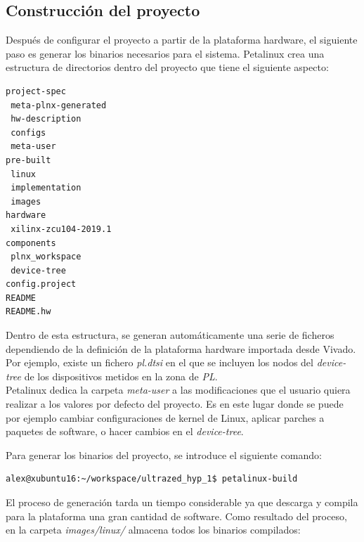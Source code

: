 \subsection{Construcción del proyecto}

Después de configurar el proyecto a partir de la plataforma hardware, el siguiente paso es generar los binarios necesarios para el sistema. Petalinux crea una estructura de directorios dentro del proyecto que tiene el siguiente aspecto:\\

\begin{lstlisting}[style=CStyle]
project-spec
 meta-plnx-generated
 hw-description
 configs
 meta-user
pre-built
 linux
 implementation
 images
hardware
 xilinx-zcu104-2019.1
components
 plnx_workspace
 device-tree
config.project
README
README.hw
\end{lstlisting}

Dentro de esta estructura, se generan automáticamente una serie de ficheros dependiendo de la definición de la plataforma hardware importada desde Vivado. Por ejemplo, existe un fichero \textit{pl.dtsi} en el que se incluyen los nodos del \textit{device-tree} de los dispositivos metidos en la zona de \textit{PL}.\\
Petalinux dedica la carpeta \textit{meta-user} a las modificaciones que el usuario quiera realizar a los valores por defecto del proyecto. Es en este lugar donde se puede por ejemplo cambiar configuraciones de kernel de Linux, aplicar parches a paquetes de software, o hacer cambios en el \textit{device-tree}.

Para generar los binarios del proyecto, se introduce el siguiente comando:

\begin{lstlisting}[style=CStyle]
alex@xubuntu16:~/workspace/ultrazed_hyp_1$ petalinux-build
\end{lstlisting}

El proceso de generación tarda un tiempo considerable ya que descarga y compila para la plataforma una gran cantidad de software. Como resultado del proceso, en la carpeta \textit{images/linux/} almacena todos los binarios compilados:

